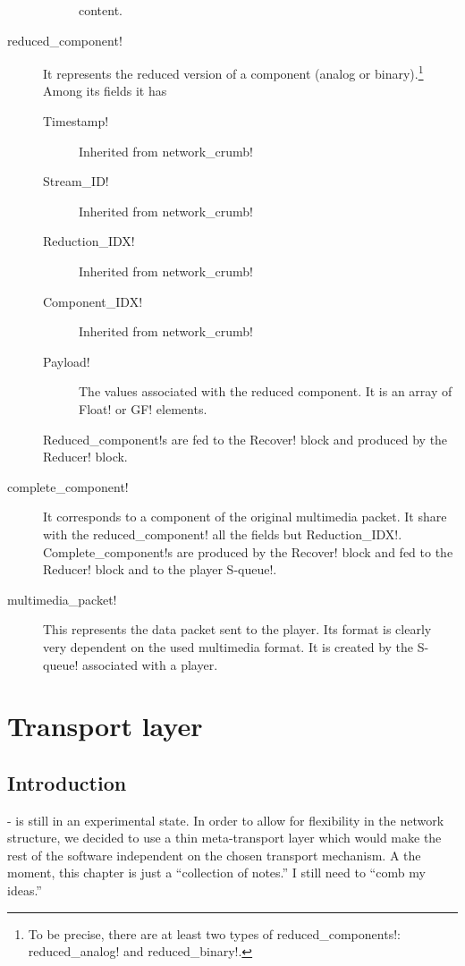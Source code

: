 \documentclass{medusabook}
\begin{document}
\begin{description}
\begin{description}
   content. 
 \end{description}
 \item[\ttt reduced\_component!] It represents the reduced version of
 a component (analog or binary).\footnote{To be precise, there are at
 least two types of \ttt reduced\_components!: \ttt reduced\_analog! and
 \ttt reduced\_binary!.}  Among its fields it has
 \begin{description}
   \item[\ttt Timestamp!] Inherited from \ttt network_crumb!
   \item[\ttt Stream\_ID!] Inherited from \ttt network_crumb!
   \item[\ttt Reduction\_IDX!] Inherited from \ttt network_crumb!
   \item[\ttt Component\_IDX!] Inherited from \ttt network_crumb!
   \item[\ttt Payload!] The values associated with the reduced
 component.  It is an array of \ttt Float! or \ttt GF! elements.
 \end{description}
%
 \ttt Reduced_component!s are fed to the \ttt Recover! block and
 produced by the \ttt Reducer! block.
 \item[\ttt complete\_component!] It corresponds to a component of the
 original multimedia packet.  It share with the \ttt
 reduced_component! all the fields but \ttt Reduction_IDX!. \ttt
 Complete_component!s are produced by the \ttt Recover! block and fed
 to the  \ttt Reducer! block and to the player \ttt S-queue!.
 \item[\ttt multimedia\_packet!] This represents the data packet sent
 to the player.  Its format is clearly very dependent on the used
 multimedia format.  It is created by the \ttt S-queue! associated
 with a player.
\end{description}
%

\chapter{Transport layer}
\label{chap:2;dsp_book}

\section{Introduction}
\label{sect:2.0;dsp_book}

\medusa- is still in an experimental state. In order to allow for
flexibility in the network structure, we decided to use a thin
meta-transport layer which would make the rest of the software
independent on the chosen transport mechanism.  A the moment, this
chapter is  just a ``collection of notes.''  I still need to ``comb my
ideas.'' 
\end{document}
